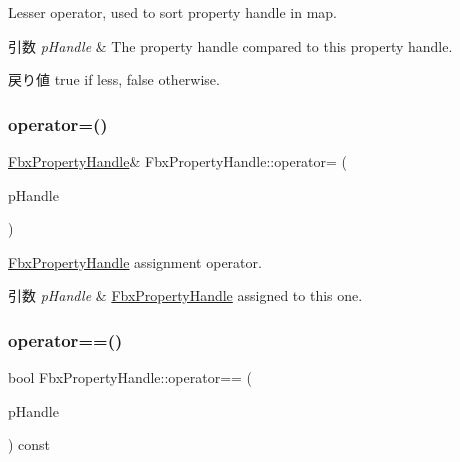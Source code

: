Lesser operator, used to sort property handle in map. 
\begin{DoxyParams}{引数}
{\em p\+Handle} & The property handle compared to this property handle. \\
\hline
\end{DoxyParams}
\begin{DoxyReturn}{戻り値}
{\ttfamily true} if less, {\ttfamily false} otherwise. 
\end{DoxyReturn}
\mbox{\label{class_fbx_property_handle_a23a41629f6fe1629b9752ea42615b010}} 
\subsubsection{\texorpdfstring{operator=()}{operator=()}}
{\footnotesize\ttfamily \hyperlink{class_fbx_property_handle}{Fbx\+Property\+Handle}\& Fbx\+Property\+Handle\+::operator= (\begin{DoxyParamCaption}\item[{const \hyperlink{class_fbx_property_handle}{Fbx\+Property\+Handle} \&}]{p\+Handle }\end{DoxyParamCaption})}

\hyperlink{class_fbx_property_handle}{Fbx\+Property\+Handle} assignment operator. 
\begin{DoxyParams}{引数}
{\em p\+Handle} & \hyperlink{class_fbx_property_handle}{Fbx\+Property\+Handle} assigned to this one. \\
\hline
\end{DoxyParams}
\mbox{\label{class_fbx_property_handle_aee6f973f1c78f4dbd6f98fd4f3766016}} 
\subsubsection{\texorpdfstring{operator==()}{operator==()}}
{\footnotesize\ttfamily bool Fbx\+Property\+Handle\+::operator== (\begin{DoxyParamCaption}\item[{const \hyperlink{class_fbx_property_handle}{Fbx\+Property\+Handle} \&}]{p\+Handle }\end{DoxyParamCaption}) const}

